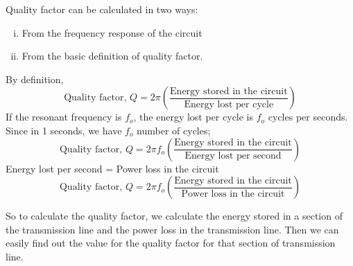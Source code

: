 Quality factor can be calculated in two ways:
\begin{enumerate}[(i)]
\item From the frequency response of the circuit
\item From the basic definition of quality factor.
\end{enumerate}
By definition,
\begin{dmath}
\text{Quality factor, }Q =2\pi\left(\frac{\text{Energy stored in the circuit}}{\text{Energy lost per cycle}}\right) 
\end{dmath}  
If the resonant frequency is $ f_{o} $, the energy lost per cycle is $ f_{o} $ cycles per seconds. Since in 1 seconds, we have $ f_{o} $ number of cycles;
\begin{dmath}
\text{Quality factor, }Q = 2\pi f_{o}\left(\frac{\text{Energy stored in the circuit}}{\text{Energy lost per second}}\right)
\end{dmath}
Energy lost per second = Power loss in the circuit  
\begin{dmath}
\text{Quality factor, }Q=2 \pi f_{o}\left(\frac{\text{Energy stored in the circuit}}{\text{Power loss in the circuit}}\right)
\end{dmath}

So to calculate the quality factor, we calculate the energy stored in a section of the transmission line and the power loss in the transmission line. Then we can easily find out the value for the quality factor for that section of transmission line.\\

